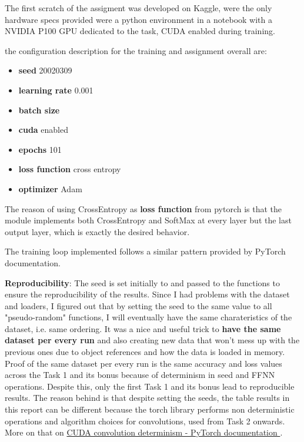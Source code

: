 \documentclass[11pt]{scrartcl}
\begin{document}
The first scratch of the assigment was developed on Kaggle, were the only hardware specs 
provided were a python environment in a notebook with a NVIDIA P100 GPU dedicated to the task,
CUDA enabled during training.

the configuration description for the training and assignment overall are:

\begin{itemize}
	\item \textbf{seed} 20020309 
	\item \textbf{learning rate} 0.001
	\item \textbf{batch size}
	\item \textbf{cuda} enabled
	\item \textbf{epochs} 101
	\item \textbf{loss function} cross entropy 
	\item \textbf{optimizer} Adam
\end{itemize}

The reason of using CrossEntropy as \textbf{loss function} from pytorch is that the 
module implements both CrossEntropy and SoftMax at every layer but the last output layer,
which is exactly the desired behavior.

The training loop implemented follows a similar pattern provided by PyTorch documentation.

\textbf{Reproducibility}:
The seed is  
set initially to 
and passed to the functions
to ensure the reproducibility of the results.
Since I had problems with the dataset and loaders, 
I figured out that by setting the seed to the same value
to all "pseudo-random" functions,
I will eventually have the same charateristics of the dataset, 
i.e. same ordering.
It was a nice and useful trick to \textbf{have the same dataset per every run}
and also creating new data that won't mess up with the previous ones due to 
object references and how the data is loaded in memory.
Proof of the same dataset per every run is the same accuracy and loss values
across the Task 1 and its bonus because of determinism in seed and FFNN operations.
Despite this, only the first Task 1 and its bonus lead to 
reproducible results.
The reason behind is that despite setting the seeds, 
the table results in this report can be different because
the torch library performs non deterministic operations
and algorithm choices for convolutions, used from Task 2 onwards.
More on that on \href{https://pytorch.org/docs/stable/notes/randomness.html}{
	CUDA convolution determinism - PyTorch documentation
}.
\end{document}
